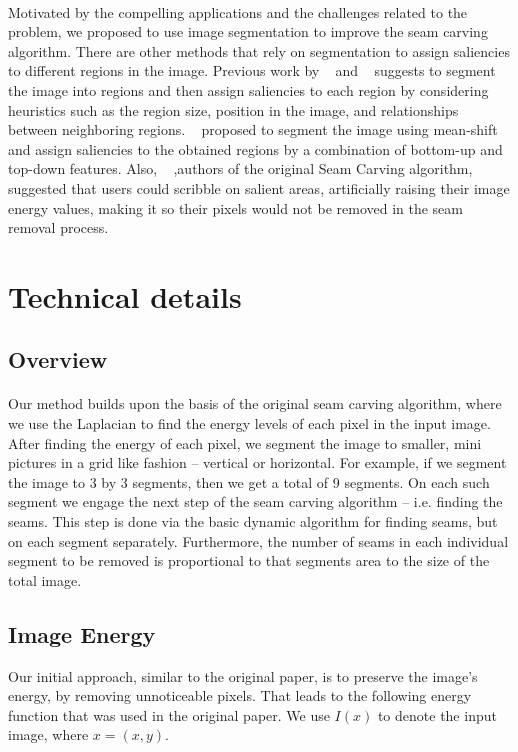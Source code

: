 \documentclass[conference]{acmsiggraph}
\begin{document}
\paragraph{}
Motivated by the compelling applications and the challenges related to the problem, we proposed to use image segmentation to improve the seam carving algorithm. There are other methods that rely on segmentation to assign saliencies to different regions in the image. Previous work by ~\cite{Liu2007} and ~\cite{Hasan2009} suggests to segment the image into regions and then assign saliencies to each region by considering heuristics such as the region size, position in the image, and relationships between neighboring regions. ~\cite{Setlur2005} proposed to segment the image using mean-shift and assign saliencies to the obtained regions by a combination of bottom-up and top-down features. Also, ~\cite{Avidan2007} ,authors of the original Seam Carving algorithm, suggested that users could scribble on salient areas, artificially raising their image energy values, making it so their pixels would not be removed in the seam removal process.  

\section{Technical details}

\subsection{Overview}

\paragraph{}
Our method builds upon the basis of the original seam carving algorithm, where we use the Laplacian to find the energy levels of each pixel in the input image. After finding the energy of each pixel, we segment the image to smaller, mini pictures in a grid like fashion -- vertical or horizontal. For example, if we segment the image to 3 by 3 segments, then we get a total of 9 segments. On each such segment we engage the next step of the seam carving algorithm -- i.e. finding the seams. This step is done via the basic dynamic algorithm for finding seams, but on each segment separately.  Furthermore, the  number of seams in each individual segment to be removed is proportional to that segments area to the size of the total image.

\subsection{Image Energy}
Our initial approach, similar to the original paper, is to preserve the image's energy, by removing unnoticeable pixels. That leads to the following energy function that was used in the original paper. We use $I(x)$ to denote the input image, where $x = (x, y)$. 
\end{document}
